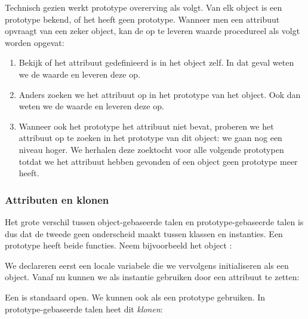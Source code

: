 \begin{figure}
\end{figure}

Technisch gezien werkt prototype overerving als volgt. Van elk object is een prototype bekend, of het heeft geen prototype. Wanneer men een attribuut opvraagt van een zeker object, kan de op te leveren waarde procedureel als volgt worden opgevat:

\begin{enumerate}
  \item Bekijk of het attribuut gedefinieerd is in het object zelf. In dat geval weten we de waarde en leveren deze op.
  \item Anders zoeken we het attribuut op in het prototype van het object. Ook dan weten we de waarde en leveren deze op.
  \item Wanneer ook het prototype het attribuut niet bevat, proberen we het attribuut op te zoeken in het prototype van dit object: we gaan nog een niveau hoger. We herhalen deze zoektocht voor alle volgende prototypen totdat we het attribuut hebben gevonden of een object geen prototype meer heeft.
\end{enumerate}

\subsubsection{Attributen en klonen}

Het grote verschil tussen object-gebaseerde talen en prototype-gebaseerde talen is dus dat de tweede geen onderscheid maakt tussen klassen en instanties. Een prototype heeft beide functies. Neem bijvoorbeeld het object :

\newCodeFragment

\begin{codelines}
\end{codelines}

We declareren eerst een locale variabele die we vervolgens initialiseren als een object. Vanaf nu kunnen we  als instantie gebruiken door een attribuut te zetten:

\begin{codelines}
\end{codelines}

Een  is standaard open. We kunnen  ook als een prototype gebruiken. In prototype-gebaseerde talen heet dit \emph{klonen}:

